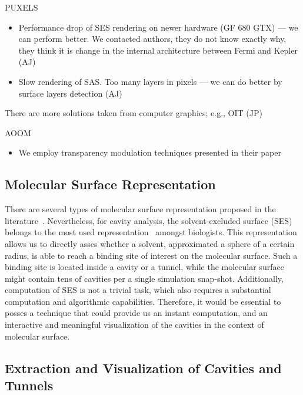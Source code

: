 PUXELS \cite{kauker2013rendering}
\begin{itemize}
  \item Performance drop of SES rendering on newer hardware (GF 680 GTX) --- we can perform better. We contacted authors, they do not know exactly why, they think it is change in the internal architecture between Fermi and Kepler (AJ)
  \item Slow rendering of SAS. Too many layers in pixels --- we can do better by surface layers detection (AJ)
\end{itemize}

There are more solutions taken from computer graphics; e.g., OIT (JP)

AOOM
\begin{itemize}
  \item We employ transparency modulation techniques presented in their paper \cite{borland2011ambient}
\end{itemize}

\subsection{Molecular Surface Representation}
There are several types of molecular surface representation proposed in the literature~\cite{STAR2015}. Nevertheless, for cavity analysis,  the solvent-excluded surface (SES) belongs to the most used representation~\cite{todo} amongst biologists. This representation allows us to directly asses whether a solvent, approximated a sphere of a certain radius, is able to reach a binding site of interest on the molecular surface. Such a binding site is located inside a cavity or a tunnel, while the molecular surface might contain tens of cavities per a single simulation snap-shot. Additionally, computation of SES is not a trivial task, which also requires a substantial computation and algorithmic capabilities. Therefore, it would be essential to posses a technique that could provide us an instant computation, and an interactive and meaningful visualization of the cavities in the context of molecular surface.
\subsection{Extraction and Visualization of Cavities and Tunnels}

